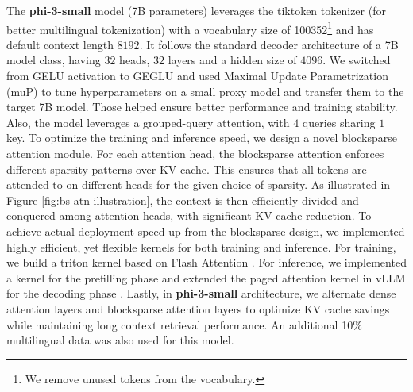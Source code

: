 \documentclass[11pt]{article}
\begin{document}
 
The \textbf{phi-3-small} model (7B parameters) leverages the tiktoken tokenizer (for better multilingual tokenization) with a vocabulary size of 100352\footnote{We remove unused tokens from the vocabulary.} and has default context length $8192$. 
It follows the standard decoder architecture of a 7B model class, having $32$ heads, $32$ layers and a hidden size of $4096$. We switched from GELU activation to GEGLU and used Maximal Update Parametrization (muP) \cite{yang2022tensor} to tune hyperparameters on a small proxy model and transfer them to the target 7B model. Those helped ensure better performance and training stability. 
Also, the model leverages a grouped-query attention, with $4$ queries sharing $1$ key. 
To optimize the training and inference speed, we design a novel blocksparse attention module.
For each attention head, the blocksparse attention enforces different sparsity patterns over KV cache. This ensures that all tokens are attended to on different heads for the given choice of sparsity.
As illustrated in Figure \ref{fig:bs-atn-illustration}, the context is then efficiently divided and conquered among attention heads, with significant KV cache reduction.
To achieve actual deployment speed-up from the blocksparse design, we implemented highly efficient, yet flexible kernels for both training and inference.
For training, we build a triton kernel based on Flash Attention \cite{dao2022flashattention}.
For inference, we implemented a kernel for the prefilling phase and extended the
paged attention kernel in vLLM for the decoding phase \cite{kwon2023efficient}.
Lastly, in \textbf{phi-3-small} architecture, we alternate dense attention layers and blocksparse attention layers to optimize KV cache savings  while maintaining long context retrieval performance. 
An additional 10\% multilingual data was also used for this model.
\end{document}
